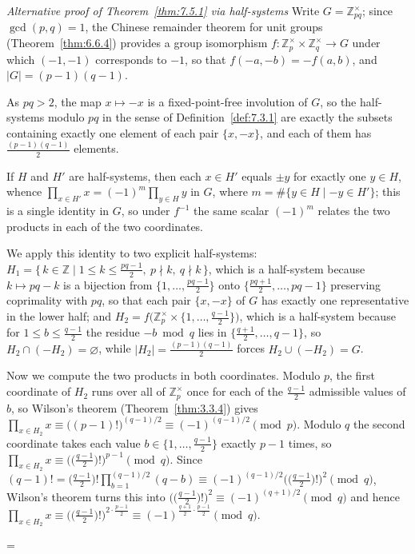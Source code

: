 \documentclass[11pt]{article}
\makeatletter
\theoremstyle{ntstyle}
\let\nt@closedisplay\]
\def\nt@guardedclose{\@ifnextchar\par{\nt@closeafterpar}{\@ifnextchar\end{\postdisplaypenalty\@M\nt@closedisplay}{\nt@closedisplay}}}
\def\nt@closeafterpar\par{\@ifnextchar\par{\nt@closeafterpar}{\@ifnextchar\end{\postdisplaypenalty\@M\nt@closedisplay\par}{\nt@closedisplay\par}}}
\renewenvironment{proof}[1][\proofname]{\par
  \pushQED{\qed}\normalfont\topsep\medskipamount\edef\nt@afterproof{\@endparpenalty=\the\@endparpenalty\relax}\@beginparpenalty\@M\@endparpenalty\@M\let\]\nt@guardedclose\trivlist\item[]\textit{#1\@addpunct{.}} \ignorespaces}{\ifvmode\addpenalty\@M\fi\popQED\nt@afterproof\endtrivlist\@endpefalse}
\newenvironment{altproof}[1][\proofname]{\begin{proof}[#1]\renewcommand{\qedsymbol}{}}{\end{proof}}
\newcommand{\ZmodUnits}[1]{\mathbb{Z}_{#1}^{\times}}
\makeatother
\begin{document}
\begin{altproof}[Alternative proof of Theorem~\ref{thm:7.5.1} via half-systems] Write $G = \ZmodUnits{pq}$; since $\gcd(p, q)
		= 1$, the Chinese remainder theorem for unit groups (Theorem~\ref{thm:6.6.4}) provides a group
	isomorphism $f : \ZmodUnits{p} \times \ZmodUnits{q}
		\to G$ under which $(-1, -1)$ corresponds to $-1$, so that $f(-a, -b)
		= -f(a, b)$, and $|G| = (p-1)(q-1)$.

	As $pq > 2$, the map $x \mapsto
		-x$ is a fixed-point-free involution of $G$, so the half-systems modulo
	$pq$ in the sense of Definition~\ref{def:7.3.1} are exactly the subsets containing
	exactly one element of each pair $\{x, -x\}$, and each of them has
	$\tfrac{(p-1)(q-1)}{2}$ elements.

	If $H$ and $H'$
	are half-systems, then each $x \in H'$ equals $\pm y$ for exactly one
	$y \in H$, whence $\prod_{x \in H'} x = (-1)^{m} \prod_{y \in H} y$ in
	$G$, where $m = \#\{y \in H \mid -y \in H'\}$; this is a single
	identity in $G$, so under $f^{-1}$ the same scalar $(-1)^{m}$ relates
	the two products in each of the two coordinates.

	We apply this identity to two explicit
	half-systems: $H_1 = \{\, k \in \mathbb{Z} \mid 1 \le k \le
		\tfrac{pq-1}{2},\ p \nmid k,\ q \nmid k \,\}$, which is a half-system
	because $k \mapsto pq - k$ is a bijection from $\{1, \ldots,
		\tfrac{pq-1}{2}\}$ onto $\{\tfrac{pq+1}{2}, \ldots, pq-1\}$
	preserving coprimality with $pq$, so that each pair $\{x, -x\}$ of $G$
	has exactly one representative in the lower half; and $H_2 =
		f\big(\ZmodUnits{p} \times \{1, \ldots,
		\tfrac{q-1}{2}\}\big)$, which is a half-system because for $1 \le b
		\le \tfrac{q-1}{2}$ the residue $-b \bmod q$ lies in
	$\{\tfrac{q+1}{2}, \ldots, q-1\}$, so $H_2 \cap (-H_2) = \varnothing$,
	while $|H_2| = \tfrac{(p-1)(q-1)}{2}$ forces $H_2 \cup (-H_2) = G$.

	Now we compute the two products in both coordinates. Modulo $p$, the
	first coordinate of $H_2$ runs over all of $\ZmodUnits{p}$
	once for each of the $\tfrac{q-1}{2}$ admissible values of $b$, so
	Wilson's theorem (Theorem~\ref{thm:3.3.4}) gives $\prod_{x \in H_2} x \equiv
		\big((p-1)!\big)^{(q-1)/2} \equiv (-1)^{(q-1)/2} \pmod{p}$. Modulo $q$
	the second coordinate takes each value $b \in \{1, \ldots,
		\tfrac{q-1}{2}\}$ exactly $p-1$ times, so $\prod_{x \in H_2} x \equiv
		\big(\big(\tfrac{q-1}{2}\big)!\big)^{p-1} \pmod{q}$. Since
	$(q-1)! = \big(\tfrac{q-1}{2}\big)! \prod_{b=1}^{(q-1)/2}(q - b)
		\equiv (-1)^{(q-1)/2}\big(\big(\tfrac{q-1}{2}\big)!\big)^{2}
		\pmod{q}$, Wilson's theorem turns this into
	$\big(\big(\tfrac{q-1}{2}\big)!\big)^{2} \equiv (-1)^{(q+1)/2}
		\pmod{q}$ and hence $\prod_{x \in H_2} x \equiv
		\big(\big(\tfrac{q-1}{2}\big)!\big)^{2 \cdot \frac{p-1}{2}} \equiv
		(-1)^{\frac{q+1}{2}\cdot\frac{p-1}{2}} \pmod{q}$.


\end{altproof}
\end{document}
